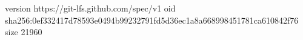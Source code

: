 version https://git-lfs.github.com/spec/v1
oid sha256:0ef332417d78593e0494b99232791fd5d36ec1a8a668998451781ca610842f76
size 21960
